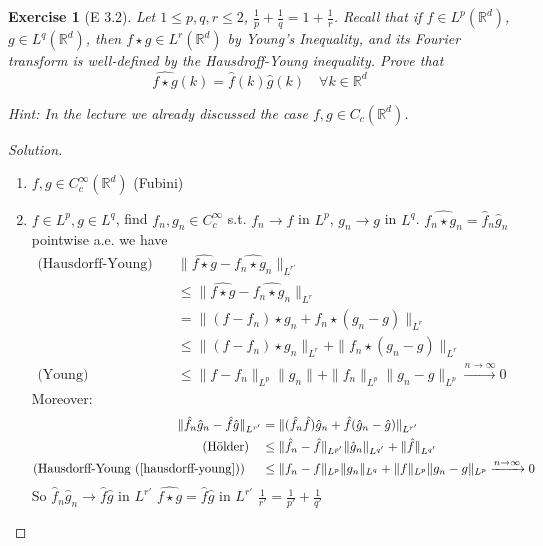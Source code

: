 \documentclass{report}
\theoremstyle{tommy}
\newtheorem{ex}[defn]{Exercise}
\begin{document}
  \begin{ex}[E 3.2]
    Let \(1 \le p, q, r \le 2\), \(\frac{1}{p} + \frac{1}{q} = 1 + \frac{1}{r}\). Recall that if \(f \in L^p(\mathbb{R}^d)\), \(g \in L^q(\mathbb{R}^d)\), then \(f \star g \in L^r(\mathbb{R}^d)\) by Young's Inequality, and its Fourier transform is well-defined by the Hausdroff-Young inequality. Prove that 
    \[\widehat{f \star g}(k) = \hat f(k) \hat g(k) \quad \forall k \in \mathbb{R}^d\]

    Hint: In the lecture we already discussed the case \(f, g \in C_c(\mathbb{R}^d)\).
  \end{ex}

  \begin{proof}[Solution] \
    \begin{enumerate}[label=Step \arabic*)]
      \item \(f, g \in C_c^\infty(\mathbb{R}^d)\) (Fubini)
      \item \(f \in L^p, g \in L^q\), find \(f_n, g_n \in C_c^\infty\) s.t. \(f_n \to f\) in \(L^p\), \(g_n \to g\) in \(L^q\). \(\widehat{f_n \star g_n} = \hat f_n \hat g_n\) pointwise a.e. we have
      \begin{align*}
        \text{(Hausdorff-Young)} \quad &\|\widehat{f \star g} - \widehat{f_n \star g_n}\|_{L^{r'}} \\
        &\le \|\widehat{f \star g} - \widehat{f_n \star g_n}\|_{L^r} \\
        &= \|(f - f_n) \star g_n + f_n \star (g_n - g) \|_{L^r} \\
        &\le \| (f-f_n) \star g_n \|_{L^r} + \| f_n \star (g_n - g)\|_{L^r} \\
        \text{(Young)} &\le \|f - f_n\|_{L^p} \|g_n\| + \|f_n\|_{L^p} \|g_n - g\|_{L^p} \xrightarrow{n \to \infty} 0
      \end{align*}
      Moreover:
      \begin{align*}
        \|\hat f_n \hat g_n - \hat f \hat g \|_{L^{r'}} 
        &= \|(\hat f_n \hat f)\hat g_n + \hat f (\hat g_n - \hat g) \|_{L^{r'}} \\
        \text{(Hölder)} \quad &\le \|\hat f_n - \hat f \|_{L^{p'}} \| \hat g_n \|_{L^{q'}} + \| \hat f \|_{L^{q'}} \\
        \text{(Hausdorff-Young (\ref{hausdorff-young}))} \quad &\le \| f_n - f \|_{L^p}\|g_n\|_{L^q} + \|f\|_{L^p} \|g_n - g\|_{L^p} \xrightarrow{n \to \infty} 0
      \end{align*}
      So \(\hat f_n \hat g_n \to \hat f \hat g \text{ in } L^{r'}\)
      \(\widehat{f \star g} = \hat f \hat g\) in \(L^{r'}\)
      \(\frac{1}{r'} = \frac{1}{p'} + \frac{1}{q'}\) \qedhere
    \end{enumerate}
  \end{proof}
\end{document}
